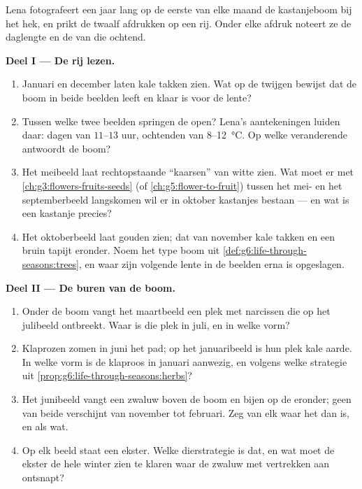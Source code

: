 \begin{problem}\label{pb:g6:life-through-seasons:1}
Lena fotografeert een jaar lang op de eerste van elke maand de
kastanjeboom bij het hek, en prikt de twaalf afdrukken op een rij. Onder
elke afdruk noteert ze de daglengte en de  van die ochtend.

\medskip\noindent\textbf{Deel I --- De rij lezen.}
\begin{enumerate}
  \item Januari en december laten kale takken zien. Wat op de twijgen
        bewijst dat de boom in beide beelden leeft en klaar is voor de
        lente?
  \item Tussen welke twee beelden springen de  open? Lena's
        aantekeningen luiden daar: dagen van $11$--$13$ uur, ochtenden
        van $8$--\qty{12}{\degreeCelsius}. Op welke veranderende
         antwoordt de boom?
  \item Het meibeeld laat rechtopstaande ``kaarsen'' van witte 
        zien. Wat moet er met \cref{ch:g3:flowers-fruits-seeds} (of
        \cref{ch:g5:flower-to-fruit}) tussen het mei- en het
        septemberbeeld langskomen wil er in oktober kastanjes bestaan
        --- en wat is een kastanje precies?
  \item Het oktoberbeeld laat gouden  zien; dat van november
        kale takken en een bruin tapijt eronder. Noem het type boom uit
        \cref{def:g6:life-through-seasons:trees}, en waar zijn volgende
        lente in de beelden erna is opgeslagen.
\end{enumerate}

\medskip\noindent\textbf{Deel II --- De buren van de boom.}
\begin{enumerate}[resume]
  \item Onder de boom vangt het maartbeeld een plek met narcissen die op
        het julibeeld ontbreekt. Waar is die plek in juli, en in welke
        vorm?
  \item Klaprozen zomen in juni het pad; op het januaribeeld is hun
        plek kale aarde. In welke vorm is de klaproos in januari
        aanwezig, en volgens welke strategie uit
        \cref{prop:g6:life-through-seasons:herbs}?
  \item Het junibeeld vangt een zwaluw boven de boom en bijen op de
         eronder; geen van beide verschijnt van november tot
        februari. Zeg van elk waar het dan is, en als wat.
  \item Op elk beeld staat een ekster. Welke dierstrategie is dat, en
        wat moet de ekster de hele winter zien te klaren waar de zwaluw
        met vertrekken aan ontsnapt?
\end{enumerate}


\end{problem}
